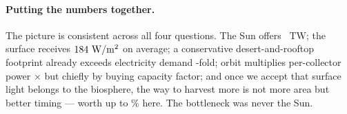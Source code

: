\paragraph{Putting the numbers together.} The picture is consistent across all
four questions. The Sun offers \InterceptedTW~TW; the surface receives
$184~\mathrm{W/m^2}$ on average; a conservative desert-and-rooftop
footprint already exceeds electricity demand \TimesElec-fold; orbit multiplies
per-collector power \SbspRatio$\times$ but chiefly by buying capacity factor;
and once we accept that surface light belongs to the biosphere, the way to
harvest more is not more area but better timing --- worth up to
\TemporalGainMax\% here. The bottleneck was never the Sun.
